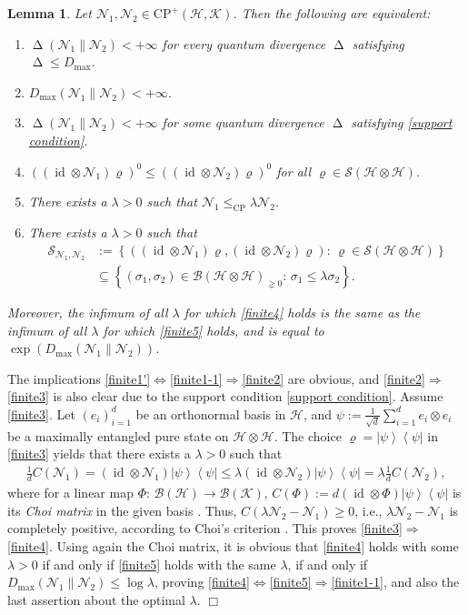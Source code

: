 \documentclass[unsortedaddress,superscriptaddress,pra,notitlepage]{revtex4}
\newtheorem{lemma}[definition]{Lemma}
\newenvironment{proof}[1][Proof]{\begin{trivlist}
\item[\hskip \labelsep {\bfseries #1}]}{\hfill$\Box$\end{trivlist}}
\newcommand{\nn}{\nonumber \\}
\def\B{{\mathcal B}}
\def\N{\mathcal{N}}
\def\S{{\mathcal S}}
\def\rho{\varrho}
\def\hil{{\mathcal H}}
\def\kil{{\mathcal K}}
\def\iff{\Longleftrightarrow}
\def\imp{\Longrightarrow}
\def\bz{\left(}
\def\jz{\right)}
\def\map{\Phi}
\def\nn{\nonumber}
\def\CP{\mathrm{CP}}
\def\pne{_{\gneq 0}}
\def\cple{\le_{\mathrm{CP}}}
\newcommand{\ki}[1]{\textit{\textit{#1}}}
\newcommand{\diad}[2]{\left|#1\right\rangle\!\left\langle #2\right|}
\newcommand{\pr}[1]{\diad{#1}{#1}}
\DeclareMathOperator{\id}{id}
\DeclareMathOperator{\divv}{\Delta}
\begin{document}
\begin{lemma}\label{lemma:ch div finite}
Let $\N_1,\N_2\in\CP^+(\hil,\kil)$. Then the following are equivalent:
\begin{enumerate}
\item\label{finite1'}
$\divv(\N_1\|\N_2)<+\infty$ for every quantum divergence $\divv$ satisfying
$\divv\le D_{\max}$.
\item\label{finite1-1}
$D_{\max}(\N_1\|\N_2)<+\infty$.
\item\label{finite2}
$\divv(\N_1\|\N_2)<+\infty$ for some quantum divergence $\divv$ satisfying
\eqref{support condition}.
\item\label{finite3}
$\bz(\id\otimes\N_1)\rho\jz^0\le\bz(\id\otimes\N_2)\rho\jz^0$ for all 
$\rho\in\S(\hil\otimes\hil)$.
\item\label{finite4}
There exists a $\lambda>0$ such that $\N_1\cple\lambda\N_2$. 
\item\label{finite5}
There exists a $\lambda>0$ such that
\begin{align}
\S_{\N_1,\N_2}
&:=
\left\{\bz(\id\otimes\N_1)\rho,(\id\otimes\N_2)\rho\jz:\,\rho\in\S(\hil\otimes\hil)\right\}\nn\\
&\subseteq
\left\{(\sigma_1,\sigma_2)\in\B(\hil\otimes\hil)\pne:\,\sigma_1\le\lambda\sigma_2\right\}.
\label{channel pair image}
\end{align}
\end{enumerate}
Moreover, the infimum of all $\lambda$ for which 
\ref{finite4} holds is the same as
the infimum of all $\lambda$ for which 
\ref{finite5} holds, and is equal to 
$\exp(D_{\max}(\N_1\|\N_2))$.
\end{lemma}
\begin{proof}
The implications \ref{finite1'}$\iff$\ref{finite1-1}$\imp$\ref{finite2} are obvious, and 
\ref{finite2}$\imp$\ref{finite3} is also clear due to the support condition 
\eqref{support condition}.
Assume \ref{finite3}. Let $(e_i)_{i=1}^d$ be an orthonormal basis in $\hil$, and $\psi:=\frac{1}{\sqrt{d}}\sum_{i=1}^d e_i\otimes e_i$ be a maximally entangled pure state on 
$\hil\otimes\hil$. 
The choice $\rho=\pr{\psi}$ in \ref{finite3} yields that 
there exists a $\lambda>0$ such that
\begin{align*}
\frac{1}{d}C(\N_1)=(\id\otimes\N_1)\pr{\psi}\le \lambda(\id\otimes\N_2)\pr{\psi}=\lambda
\frac{1}{d}C(\N_2),
\end{align*}
where for a linear map $\map:\,\B(\hil)\to\B(\kil)$, 
$C(\map):=d(\id\otimes\map)\pr{\psi}$ is its \ki{Choi matrix} in the given basis
\cite{Choi1975}.
Thus, $C(\lambda\N_2-\N_1)\ge 0$, i.e., 
$\lambda\N_2-\N_1$ is completely positive, according to Choi's criterion
\cite{Choi1975}.
This proves \ref{finite3}$\imp$\ref{finite4}.
Using again the Choi matrix, it is obvious that 
\ref{finite4} holds with some $\lambda>0$ if and only if 
\ref{finite5} holds with the same $\lambda$, if and only if 
$D_{\max}(\N_1\|\N_2)\le\log\lambda$, proving 
\ref{finite4}$\iff$\ref{finite5}$\imp$\ref{finite1-1}, and also the last assertion 
about the optimal $\lambda$.
\end{proof}
\end{document}
